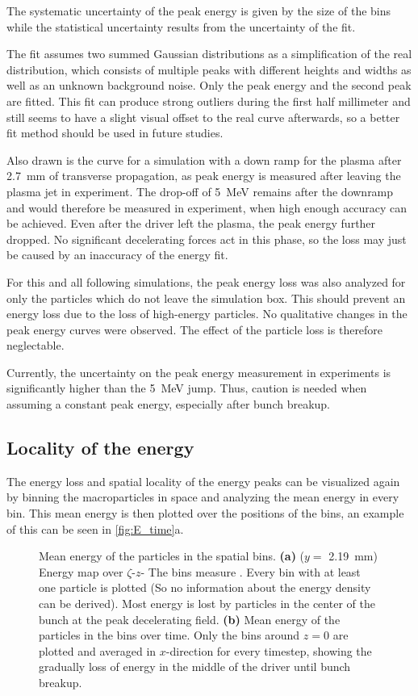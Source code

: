 \documentclass[bachelor_thesis]{subfiles}
\begin{document}
The systematic uncertainty of the peak energy is given by the size of the bins while the statistical uncertainty results from the uncertainty of the fit. 

The fit assumes two summed Gaussian distributions as a simplification of the real distribution, which consists of multiple peaks with different heights and widths as well as an unknown background noise. Only the peak energy and the second peak are fitted.
This fit can produce strong outliers during the first half millimeter and still seems to have a slight visual offset to the real curve afterwards, so a better fit method should be used in future studies.

Also drawn is the curve for a simulation with a down ramp for the plasma after \qty{2.7}{\mm} of transverse propagation, as peak energy is measured after leaving the plasma jet in experiment. The drop-off of \qty{5}{\MeV} remains after 
the downramp and would therefore be measured in experiment, when high enough accuracy can be achieved. Even after the driver left the plasma, the peak energy further dropped. 
No significant decelerating forces act in this phase, so the loss may just be caused by an inaccuracy of the energy fit. 

For this and all following simulations, the peak energy loss was also analyzed for only the particles which do not leave the simulation box.
This should prevent an energy loss due to the loss of high-energy particles. No qualitative changes in the peak energy curves were observed. The effect of the particle loss is therefore neglectable.

Currently, the uncertainty on the peak energy measurement in experiments is significantly higher than the \qty{5}{\MeV} jump. Thus, caution is needed when assuming a constant peak energy, especially after bunch breakup.

\subsection{Locality of the energy}\label{chap:loc_E}
The energy loss and spatial locality of the energy peaks can be visualized again by binning the macroparticles in space and analyzing the mean energy in every bin. This mean energy is then plotted over the positions of the bins,
an example of this can be seen in \autoref{fig:E_time}a. 
\begin{figure}
	\centering
	
	\caption{Mean energy of the particles in the spatial bins.
	\textbf{(a)} ($y=$ \qty{2.19}{mm}) Energy map over $\zeta$-$z$- The bins measure . Every bin with at least one particle is plotted (So no information about the energy density can be derived). 
	Most energy is lost by particles in the center of the bunch at the peak decelerating field.
	\textbf{(b)} Mean energy of the particles in the bins over time. Only the bins around $z=0$ are plotted and averaged in $x$-direction for every timestep, showing the gradually loss of energy in the middle of the driver until bunch breakup.}
	\label{fig:E_time}
\end{figure}
\end{document}
